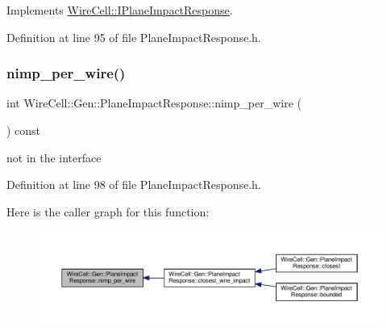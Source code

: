 Implements \hyperlink{class_wire_cell_1_1_i_plane_impact_response_acc087884ba0315e588e29398062ed12e}{Wire\+Cell\+::\+I\+Plane\+Impact\+Response}.



Definition at line 95 of file Plane\+Impact\+Response.\+h.

\mbox{\label{class_wire_cell_1_1_gen_1_1_plane_impact_response_a0b1b68468b3987429e394680deb33c76}} 
\subsubsection{\texorpdfstring{nimp\+\_\+per\+\_\+wire()}{nimp\_per\_wire()}}
{\footnotesize\ttfamily int Wire\+Cell\+::\+Gen\+::\+Plane\+Impact\+Response\+::nimp\+\_\+per\+\_\+wire (\begin{DoxyParamCaption}{ }\end{DoxyParamCaption}) const\hspace{0.3cm}{\ttfamily [inline]}}



not in the interface 



Definition at line 98 of file Plane\+Impact\+Response.\+h.

Here is the caller graph for this function\+:
\nopagebreak
\begin{figure}[H]
\begin{center}
\leavevmode
\includegraphics[width=350pt]{class_wire_cell_1_1_gen_1_1_plane_impact_response_a0b1b68468b3987429e394680deb33c76_icgraph}
\end{center}
\end{figure}
\mbox{\label{class_wire_cell_1_1_gen_1_1_plane_impact_response_a8fc3604f6bd80d29095f205c59b768c2}} 
